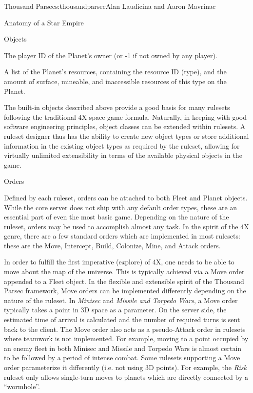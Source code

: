 \begin{aosachapter}{Thousand Parsec}{s:thousandparsec}{Alan Laudicina and Aaron Mavrinac}
\begin{aosasect1}{Anatomy of a Star Empire}
\begin{aosasect2}{Objects}
\begin{aosaitemize}

  \item The player ID of the Planet's owner (or -1 if not owned by any
  player).

  \item A list of the Planet's resources, containing the resource ID
  (type), and the amount of surface, mineable, and inaccessible
  resources of this type on the Planet.

\end{aosaitemize}

The built-in objects described above provide a good basis for many
rulesets following the traditional 4X space game formula. Naturally,
in keeping with good software engineering principles, object classes
can be extended within rulesets. A ruleset designer thus has the
ability to create new object types or store additional information in
the existing object types as required by the ruleset, allowing for
virtually unlimited extensibility in terms of the available physical
objects in the game.

\end{aosasect2}

\begin{aosasect2}{Orders}

Defined by each ruleset, orders can be attached to both Fleet and
Planet objects. While the core server does not ship with any default
order types, these are an essential part of even the most basic
game. Depending on the nature of the ruleset, orders may be used to
accomplish almost any task. In the spirit of the 4X genre, there are a
few standard orders which are implemented in most rulesets: these are
the Move, Intercept, Build, Colonize, Mine, and Attack orders.

In order to fulfill the first imperative (e\emph{x}plore) of 4X, one
needs to be able to move about the map of the universe. This is
typically achieved via a Move order appended to a Fleet object. In the
flexible and extensible spirit of the Thousand Parsec framework, Move
orders can be implemented differently depending on the nature of the
ruleset. In \emph{Minisec} and \emph{Missile and Torpedo Wars}, a Move
order typically takes a point in 3D space as a parameter. On the
server side, the estimated time of arrival is calculated and the
number of required turns is sent back to the client. The Move order
also acts as a pseudo-Attack order in rulesets where teamwork is not
implemented. For example, moving to a point occupied by an enemy fleet
in both Minisec and Missile and Torpedo Wars is almost certain to be
followed by a period of intense combat. Some rulesets supporting a Move
order parameterize it differently (i.e. not using 3D points). For
example, the \emph{Risk} ruleset only allows single-turn moves to
planets which are directly connected by a ``wormhole''.


\end{aosasect2}
\end{aosasect1}
\end{aosachapter}
